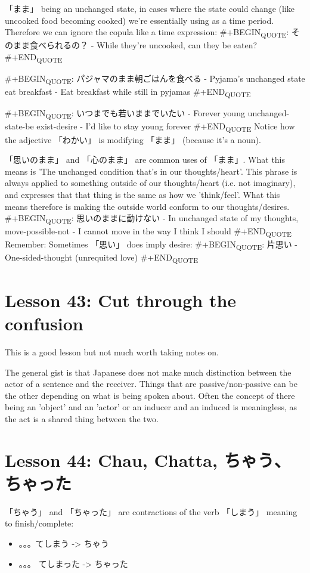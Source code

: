 \documentclass[11pt]{article}
\begin{document}
「まま」 being an unchanged state, in cases where the state could change (like uncooked food becoming cooked) we're essentially using as a time period. Therefore we can ignore the copula like a time expression:
\#+BEGIN\textsubscript{QUOTE}:
そのまま食べられるの？ - While they're uncooked, can they be eaten?
\#+END\textsubscript{QUOTE}

\#+BEGIN\textsubscript{QUOTE}:
パジャマのまま朝ごはんを食べる - Pyjama's unchanged state eat breakfast - Eat breakfast while still in pyjamas
\#+END\textsubscript{QUOTE}

\#+BEGIN\textsubscript{QUOTE}:
いつまでも若いままでいたい - Forever young unchanged-state-be exist-desire - I'd like to stay young forever
\#+END\textsubscript{QUOTE}
Notice how the adjective 「わかい」 is modifying 「まま」 (because it's a noun).

「思いのまま」 and 「心のまま」 are common uses of 「まま」. What this means is 'The unchanged condition that's in our thoughts/heart'. This phrase is always applied to something outside of our thoughts/heart (i.e. not imaginary), and expresses that that thing is the same as how we 'think/feel'. What this means therefore is making the outside world conform to our thoughts/desires.
\#+BEGIN\textsubscript{QUOTE}:
思いのままに動けない - In unchanged state of my thoughts, move-possible-not - I cannot move in the way I think I should
\#+END\textsubscript{QUOTE}
Remember: Sometimes 「思い」 does imply desire:
\#+BEGIN\textsubscript{QUOTE}:
片思い - One-sided-thought (unrequited love)
\#+END\textsubscript{QUOTE}

\section{Lesson 43: Cut through the confusion}
\label{sec:org492b4ad}
This is a good lesson but not much worth taking notes on.

The general gist is that Japanese does not make much distinction between the actor of a sentence and the receiver. Things that are passive/non-passive can be the other depending on what is being spoken about. Often the concept of there being an 'object' and an 'actor' or an inducer and an induced is meaningless, as the act is a shared thing between the two.

\section{Lesson 44: Chau, Chatta, ちゃう、 ちゃった}
\label{sec:org1ec1764}
「ちゃう」 and 「ちゃった」 are contractions of the verb 「しまう」 meaning to finish/complete:
\begin{itemize}
\item 。。。てしまう -> ちゃう
\item 。。。 てしまった -> ちゃった
\end{itemize}
\end{document}
